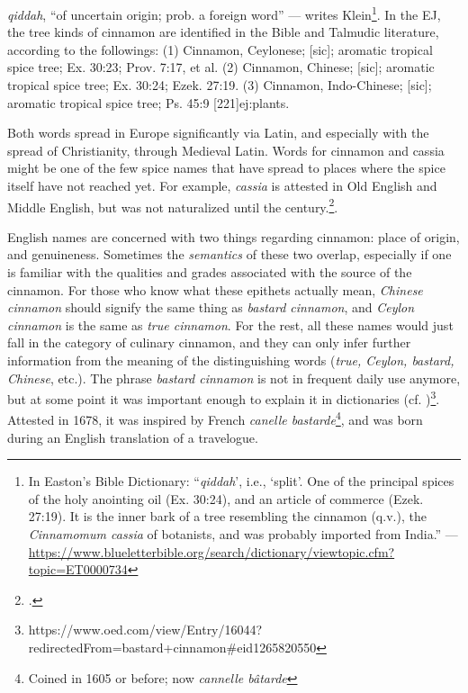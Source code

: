\textit{qiddah}, ``of uncertain origin; prob. a foreign word'' --- writes Klein\footnote{In Easton's Bible Dictionary: ``\textit{qiddah}', i.e., `split'. One of the principal spices of the holy anointing oil (Ex. 30:24), and an article of commerce (Ezek. 27:19). It is the inner bark of a tree resembling the cinnamon (q.v.), the \textit{Cinnamomum cassia} of botanists, and was probably imported from India.'' --- \url{https://www.blueletterbible.org/search/dictionary/viewtopic.cfm?topic=ET0000734}}. 
In the \gls{EJ}, the tree kinds of cinnamon are identified in the Bible and Talmudic literature, according to the followings: (1) Cinnamon, Ceylonese;  [sic];  aromatic tropical spice tree; Ex. 30:23; Prov. 7:17, et al. (2) Cinnamon, Chinese;  [sic];  aromatic tropical spice tree; Ex. 30:24; Ezek. 27:19. (3) Cinnamon, Indo-Chinese;  [sic]; 
aromatic tropical spice tree; Ps. 45:9 [221]{ej:plants}.

Both words spread in Europe significantly via Latin, and especially with the spread of Christianity, through Medieval Latin. Words for cinnamon and cassia \parencite[cf.][38]{musselman_dictionary_2012} might be one of the few spice names that have spread to places where the spice itself have not reached yet. For example, \textit{cassia} is attested in Old English and Middle English, but was not naturalized until the  century.\footcite[cassia]{hoad_concise_2003}.


 



English names are concerned with two things regarding cinnamon: place of origin, and genuineness. Sometimes the \emph{semantics} of these two overlap, especially if one is familiar with the qualities and grades associated with the source of the cinnamon. For those who know what these epithets actually mean, \textit{Chinese cinnamon} should signify the same thing as \textit{bastard cinnamon}, and \textit{Ceylon cinnamon} is the same as \textit{true cinnamon}. For the rest, all these names would just fall in the category of culinary cinnamon, and they can only infer further information from the meaning of the distinguishing words (\textit{true, Ceylon, bastard, Chinese}, etc.). The phrase \textit{bastard cinnamon} is not in frequent daily use anymore, but at some point it was important enough to explain it in dictionaries (cf. )\footnote{https://www.oed.com/view/Entry/16044?redirectedFrom=bastard+cinnamon\#eid1265820550}. Attested in 1678, it was inspired by French \obs \textit{canelle bastarde}\footnote{Coined in 1605 or before; now \textit{cannelle bâtarde}}, and was born during an English translation of a travelogue. 

